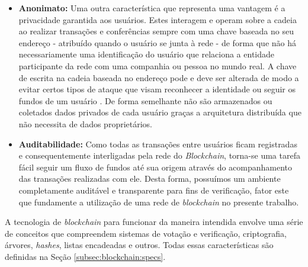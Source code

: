 \begin{itemize}
    \item \textbf{Anonimato:} Uma outra característica que representa uma vantagem é a privacidade garantida aos usuários. Estes interagem e operam sobre a cadeia ao realizar transações e conferências sempre com uma chave baseada no seu endereço - atribuído quando o usuário se junta à rede - de forma que não há necessariamente uma identificação do usuário que relaciona a entidade participante da rede com uma companhia ou pessoa no mundo real. A chave de escrita na cadeia baseada no endereço pode e deve ser alterada de modo a evitar certos tipos de ataque que visam reconhecer a identidade ou seguir os fundos de um usuário \cite{blockchain:survey_bitcoin}. De forma semelhante não são armazenados ou coletados dados privados de cada usuário graças a arquitetura distribuída que não necessita de dados proprietários.
    \item \textbf{Auditabilidade:} Como todas as transações entre usuários ficam registradas e consequentemente interligadas pela rede do \textit{Blockchain}, torna-se uma tarefa fácil seguir um fluxo de fundos até sua origem através do acompanhamento das transações realizadas com ele. Desta forma, possuímos um ambiente completamente auditável e transparente para fins de verificação, fator este que fundamente a utilização de uma rede de \textit{blockchain} no presente trabalho.
\end{itemize}
%
A tecnologia de \textit{blockchain} para funcionar da maneira intendida envolve uma série de conceitos que compreendem sistemas de votação e verificação, criptografia, árvores, \textit{hashes}, listas encadeadas e outros. Todas essas características são definidas na Seção \ref{subsec:blockchain:specs}.

